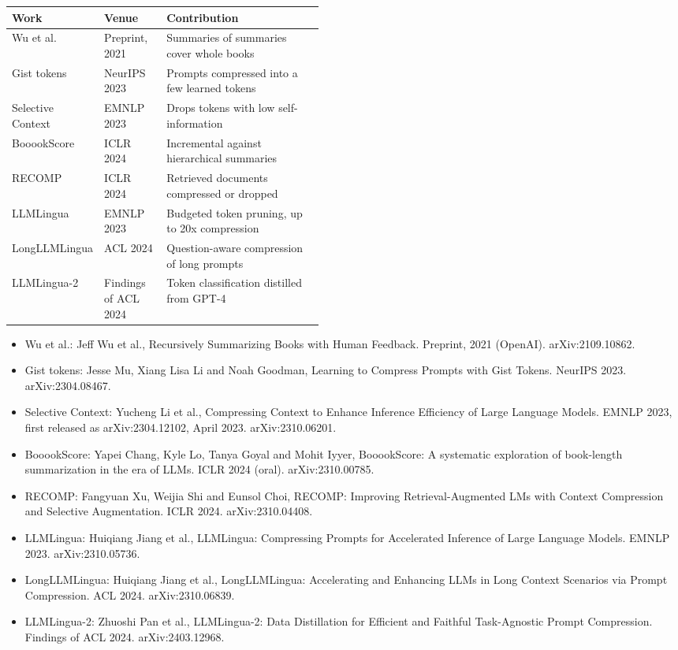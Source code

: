 \begin{center}\footnotesize
\begin{tabularx}{\linewidth}{L{0.26\linewidth}L{0.2\linewidth}X}
\toprule
\textbf{Work} & \textbf{Venue} & \textbf{Contribution} \\
\midrule
Wu et al. & Preprint, 2021 & Summaries of summaries cover whole books \\
Gist tokens & NeurIPS 2023 & Prompts compressed into a few learned tokens \\
Selective Context & EMNLP 2023 & Drops tokens with low self-information \\
BooookScore & ICLR 2024 & Incremental against hierarchical summaries \\
RECOMP & ICLR 2024 & Retrieved documents compressed or dropped \\
LLMLingua & EMNLP 2023 & Budgeted token pruning, up to 20x compression \\
LongLLMLingua & ACL 2024 & Question-aware compression of long prompts \\
LLMLingua-2 & Findings of ACL 2024 & Token classification distilled from GPT-4 \\
\bottomrule
\end{tabularx}
\end{center}

\begin{itemize}[leftmargin=*]
\item Wu et al.: Jeff Wu et al., Recursively Summarizing Books with Human Feedback. Preprint, 2021 (OpenAI). arXiv:2109.10862.
\item Gist tokens: Jesse Mu, Xiang Lisa Li and Noah Goodman, Learning to Compress Prompts with Gist Tokens. NeurIPS 2023. arXiv:2304.08467.
\item Selective Context: Yucheng Li et al., Compressing Context to Enhance Inference Efficiency of Large Language Models. EMNLP 2023, first released as arXiv:2304.12102, April 2023. arXiv:2310.06201.
\item BooookScore: Yapei Chang, Kyle Lo, Tanya Goyal and Mohit Iyyer, BooookScore: A systematic exploration of book-length summarization in the era of LLMs. ICLR 2024 (oral). arXiv:2310.00785.
\item RECOMP: Fangyuan Xu, Weijia Shi and Eunsol Choi, RECOMP: Improving Retrieval-Augmented LMs with Context Compression and Selective Augmentation. ICLR 2024. arXiv:2310.04408.
\item LLMLingua: Huiqiang Jiang et al., LLMLingua: Compressing Prompts for Accelerated Inference of Large Language Models. EMNLP 2023. arXiv:2310.05736.
\item LongLLMLingua: Huiqiang Jiang et al., LongLLMLingua: Accelerating and Enhancing LLMs in Long Context Scenarios via Prompt Compression. ACL 2024. arXiv:2310.06839.
\item LLMLingua-2: Zhuoshi Pan et al., LLMLingua-2: Data Distillation for Efficient and Faithful Task-Agnostic Prompt Compression. Findings of ACL 2024. arXiv:2403.12968.
\end{itemize}


